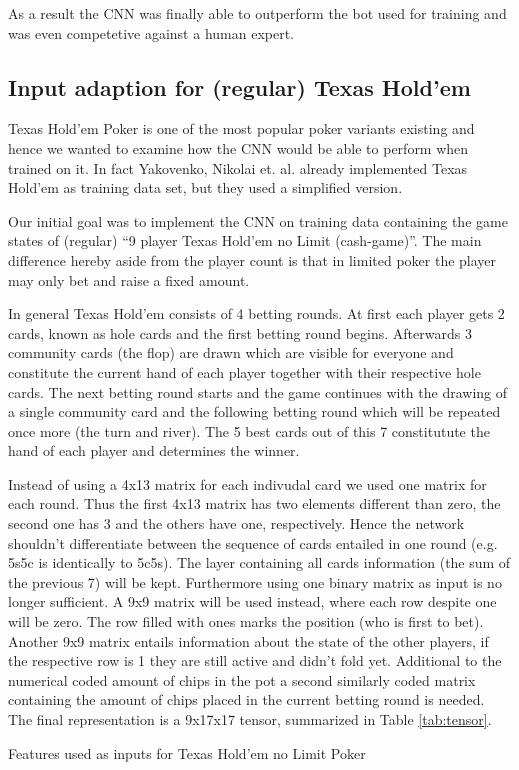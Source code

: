 \documentclass[]{report}
\begin{document}
As a result the CNN was finally able to outperform the bot used for
training and was even competetive against a human expert.

\subsection{Input adaption for (regular) Texas Hold'em \label{see:adapted_p} }

Texas Hold'em Poker is one of the most popular poker variants existing
and hence we wanted to examine how the CNN would be able to perform
when trained on it. In fact Yakovenko, Nikolai et. al. already implemented
Texas Hold'em as training data set, but they used a simplified version.

Our initial goal was to implement the CNN on training data containing
the game states of (regular) ``9 player Texas Hold'em no Limit (cash-game)''.
The main difference hereby aside from the player count is that in
limited poker the player may only bet and raise a fixed amount.

In general Texas Hold'em consists of 4 betting rounds. At first each
player gets 2 cards, known as hole cards and the first betting round
begins. Afterwards 3 community cards (the flop) are drawn which are
visible for everyone and constitute the current hand of each player
together with their respective hole cards. The next betting round
starts and the game continues with the drawing of a single community
card and the following betting round which will be repeated once more
(the turn and river). The 5 best cards out of this 7 constitutute
the hand of each player and determines the winner.

Instead of using a 4x13 matrix for each indivudal card we used one
matrix for each round. Thus the first 4x13 matrix has two elements
different than zero, the second one has 3 and the others have one,
respectively. Hence the network shouldn't differentiate between the
sequence of cards entailed in one round (e.g. 5s5c is identically
to 5c5s). The layer containing all cards information (the sum of the
previous 7) will be kept. Furthermore using one binary matrix as input
is no longer sufficient. A 9x9 matrix will be used instead, where
each row despite one will be zero. The row filled with ones marks
the position (who is first to bet). Another 9x9 matrix entails information
about the state of the other players, if the respective row is 1 they
are still active and didn't fold yet. Additional to the numerical
coded amount of chips in the pot a second similarly coded matrix containing
the amount of chips placed in the current betting round is needed.
The final representation is a 9x17x17 tensor, summarized in Table
\ref{tab:tensor}. 
\begin{table}
\caption{Features used as inputs for Texas Hold'em no Limit Poker \label{tab:tensor}}
\end{table}
\end{document}
